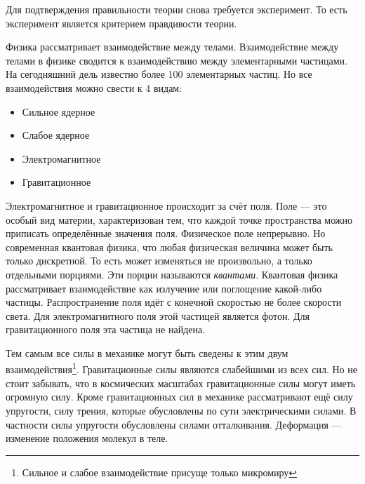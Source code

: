 Для подтверждения правильности теории снова требуется эксперимент. То есть
эксперимент является критерием правдивости теории.

\begin{center}
\end{center}

Физика рассматривает взаимодействие между телами. Взаимодействие между телами в
физике сводится к взаимодействию между элементарными частицами. На сегодняшний
дель известно более 100 элементарных частиц. Но все взаимодействия можно свести
к 4 видам:
\begin{itemize}
  \item Сильное ядерное
  \item Слабое ядерное
  \item Электромагнитное
  \item Гравитационное
\end{itemize}
Электромагнитное и гравитационное происходит за счёт поля. Поле --- это особый
вид материи, характеризован тем, что каждой точке пространства можно приписать
определённые значения поля. Физическое поле непрерывно. Но современная
квантовая физика, что любая физическая величина может быть только дискретной.
То есть может изменяться не произвольно, а только отдельными порциями. Эти
порции называются \emph{квантами}. Квантовая физика рассматривает
взаимодействие как излучение или поглощение какой-либо частицы. Распространение
поля идёт с конечной скоростью не более скорости света. Для электромагнитного
поля этой частицей является фотон. Для гравитационного поля эта частица не
найдена.

Тем самым все силы в механике могут быть сведены к этим двум
взаимодействия\footnote{Сильное и слабое взаимодействие присуще только
микромиру}. Гравитационные силы являются слабейшими из всех сил. Но не стоит
забывать, что в космических масштабах гравитационные силы могут иметь
огромную силу. Кроме гравитационных сил в механике рассматривают ещё силу
упругости, силу трения, которые обусловлены по сути электрическими силами. В
частности силы упругости обусловлены силами отталкивания. Деформация ---
изменение положения молекул в теле.

